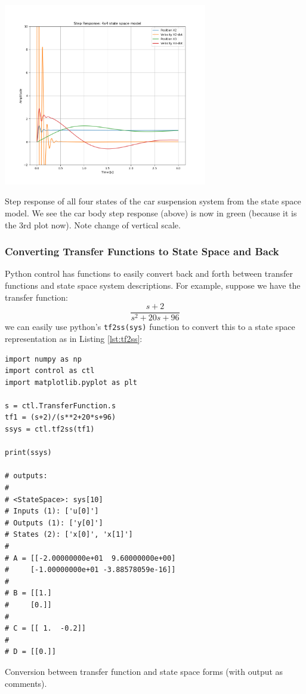\begin{ExampleCont}

\begin{center}    \includegraphics[width=3.5in]{figs08/all4StepResponsesCarBody.png}

    {Step response of all four states of the car suspension system from the state space model. We see the car body step response (above) is now in green (because it is the 3rd plot now).  Note change of vertical scale. }
\end{center}

\end{ExampleCont}


\subsubsection{Converting Transfer Functions to State Space and Back}

Python control has functions to easily convert back and forth between transfer functions and state space system descriptions.   For example, suppose we have the transfer function:
\[
\frac{s+2}{s^2+20s+96}
\]
we can easily use python's {\tt tf2ss(sys)} function
to convert this to a state space representation as in Listing \ref{lst:tf2ss}:



\begin{listing}
    \begin{verbatim}
import numpy as np
import control as ctl
import matplotlib.pyplot as plt

s = ctl.TransferFunction.s
tf1 = (s+2)/(s**2+20*s+96)
ssys = ctl.tf2ss(tf1)

print(ssys)

# outputs:
#
# <StateSpace>: sys[10]
# Inputs (1): ['u[0]']
# Outputs (1): ['y[0]']
# States (2): ['x[0]', 'x[1]']
#
# A = [[-2.00000000e+01  9.60000000e+00]
#     [-1.00000000e+01 -3.88578059e-16]]
#
# B = [[1.]
#     [0.]]
#
# C = [[ 1.  -0.2]]
#
# D = [[0.]]
\end{verbatim}
\caption{Conversion between transfer function and state space forms (with output as comments).}
\label{lst:tf2ss}
\end{listing}



